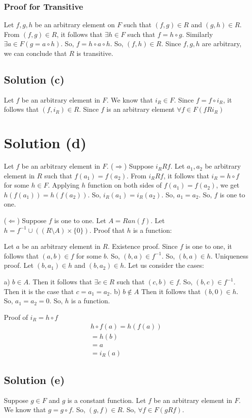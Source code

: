 \documentclass{article}
\begin{document}
\subsubsection{Proof for Transitive}
Let $f,g,h$ be an arbitrary element on $F$ such that $(f,g) \in R$ and
$(g,h) \in R$. From $(f,g) \in R$, it follows that $\exists h \in F$
such that $f = h \circ g$. Similarly $\exists a \in F(g = a \circ h)$.
So, $f = h \circ a \circ h$. So, $(f,h) \in R$. Since $f,g,h$ are
arbitrary, we can conclude that $R$ is transitive.

\subsection{Solution (c)}
Let $f$ be an arbitrary element in $F$. We know that $i_R \in F$.
Since $f = f \circ i_R$, it follows that $(f,i_R) \in R$. Since $f$ is
an arbitrary element $\forall f \in F(fRi_R)$

\section{Solution (d)}
Let $f$ be an arbitrary element in $F$.
($\Rightarrow$) Suppose $i_RRf$. Let $a_1, a_2$ be arbitrary element
in $R$ such that $f(a_1) = f(a_2)$. From $i_RRf$, it follows that $i_R
= h \circ f$ for some $h \in F$. Applying $h$ function on both sides
of $f(a_1) = f(a_2)$, we get $h(f(a_1)) = h(f(a_2))$. So, $i_R(a_1) =
i_R(a_2)$. So, $a_1 = a_2$. So, $f$ is one to one.

($\Leftarrow$) Suppose $f$ is one to one. Let $A = Ran(f)$. Let $h =
f^{-1} \cup ((R \setminus A) \times \{0\})$. Proof that $h$ is a
function:

Let $a$ be an arbitrary element in $R$.
Existence proof. Since $f$ is one to one, it follows that $(a,b) \in
f$ for some $b$. So, $(b,a) \in f^{-1}$. So, $(b,a) \in h$.
Uniqueness proof. Let $(b,a_1) \in h$ and $(b,a_2) \in h$. Let us
consider the cases:

a) $b \in A$. Then it follows that $\exists c \in R$ such that $(c,b)
\in f$. So, $(b,c) \in f^{-1}$. Then it is the case that $c = a_1 =
a_2$.
b) $b \notin A$ Then it follows that $(b,0) \in h$. So, $a_1 = a_2 =
0$. So, $h$ is a function.

Proof of $i_R = h \circ f$
\begin{align*}
  h \circ f(a) = h(f(a)) \\
  = h(b) \\
  = a \\
  = i_R(a)  
\end{align*}

\subsection{Solution (e)}
Suppose $g \in F$ and $g$ is a constant function. Let $f$ be an
arbitrary element in $F$. We know that $g = g \circ f$. So, $(g,f) \in
R$. So, $\forall f \in F(gRf)$.
\end{document}
